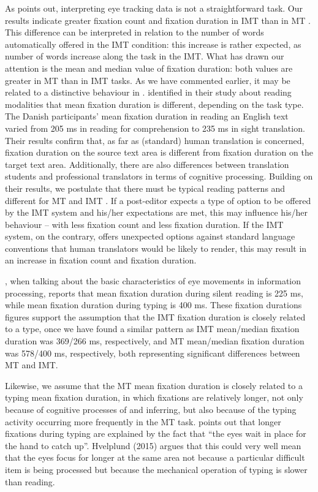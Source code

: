 \documentclass[output=paper]{langsci/langscibook}
\begin{document}
As \citet{obrien2008} points out, interpreting eye tracking data is not a straightforward task. Our results indicate greater fixation count and fixation duration in IMT  than in MT . This difference can be interpreted in relation to the number of words automatically offered in the IMT condition: this increase is rather expected, as number of words increase along the task in the IMT. What has drawn our attention is the mean and median value of fixation duration: both values are greater in MT than in IMT tasks. As we have commented earlier, it may be related to a distinctive behaviour in . \citet{jakobsen2008} identified in their study about reading modalities that mean fixation duration is different, depending on the task type. The Danish participants' mean fixation duration in reading an English text varied from 205 ms in reading for comprehension to 235 ms in sight translation. Their results confirm that, as far as (standard) human translation is concerned, fixation duration on the source text area is different from fixation duration on the target text area. Additionally, there are also differences between translation students and professional translators in terms of cognitive processing. Building on their results, we postulate that there must be typical reading patterns and different  for MT  and IMT . If a post-editor expects a type of option to be offered by the IMT system and his/her expectations are met, this may influence his/her behaviour -- with less fixation count and less fixation duration. If the IMT system, on the contrary, offers unexpected options against standard language conventions that human translators would be likely to render, this may result in an increase in fixation count and fixation duration.


\citet{rayner1998}, when talking about the basic characteristics of eye movements in information processing, reports that mean fixation duration during silent reading is 225 ms, while mean fixation duration during typing is 400 ms. These fixation durations figures support the assumption that the IMT fixation duration is closely related to a  type, once we have found a similar pattern as IMT mean/median fixation duration was 369/266 ms, respectively, and MT mean/median fixation duration was 578/400 ms, respectively, both representing significant differences between MT and IMT.



Likewise, we assume that the MT mean fixation duration is closely related to a typing mean fixation duration, in which fixations are relatively longer, not only because of cognitive processes of  and inferring, but also because of the typing activity occurring more frequently in the MT  task. \citet[396]{rayner1998} points out that longer fixations during typing are explained by the fact that ``the eyes wait in place for the hand to catch up''. Hvelplund (2015) argues that this could very well mean that the eyes focus for longer at the same area not because a particular difficult item is being processed but because the mechanical operation of typing is slower than reading.  
\end{document}
